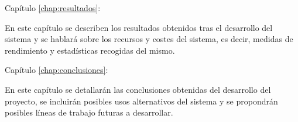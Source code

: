 \begin{definitionlist}
  \item[Capítulo \ref{chap:resultados}: \nameref{chap:resultados}]

  En este capítulo se describen los resultados obtenidos tras el desarrollo del sistema y se hablará
  sobre los recursos y costes del sistema, es decir, medidas de rendimiento y estadísticas recogidas
  del mismo.

  \item[Capítulo \ref{chap:conclusiones}: \nameref{chap:conclusiones}]

  En este capítulo se detallarán las conclusiones obtenidas del desarrollo del proyecto, se
  incluirán posibles usos alternativos del sistema y se propondrán posibles líneas de trabajo
  futuras a desarrollar.

\end{definitionlist}

